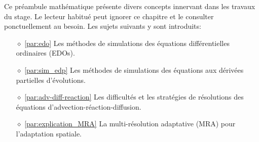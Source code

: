 Ce préambule mathématique présente divers concepts innervant dans les travaux du stage. Le lecteur habitué peut ignorer ce chapitre et 
le consulter ponctuellement au besoin. Les sujets suivants y sont introduits:
\begin{itemize}
    \item[$\diamond$] \ref{par:edo} Les méthodes de simulations des équations différentielles ordinaires (EDOs).
    \item[$\diamond$] \ref{par:sim_edp} Les méthodes de simulations des équations aux dérivées partielles d'évolutions.
    \item[$\diamond$] \ref{par:adv-diff-reaction} Les difficultés et les stratégies de résolutions des équations d'advection-réaction-diffusion.
    \item[$\diamond$] \ref{par:explication_MRA} La multi-résolution adaptative (MRA) pour l'adaptation spatiale.
\end{itemize}